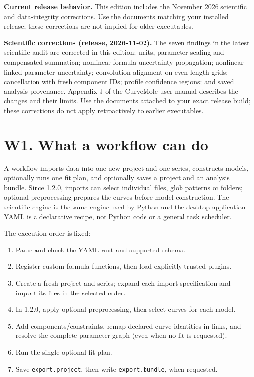 \documentclass[
  10pt,
  a4paper,
  oneside]{scrreprt}
\providecommand{\tightlist}{%
  \setlength{\itemsep}{0pt}\setlength{\parskip}{0pt}}
\begin{document}
\textbf{Current release behavior.} This edition includes the November
2026 scientific and data-integrity corrections. Use the documents
matching your installed release; these corrections are not implied for
older executables.

\textbf{Scientific corrections (release, 2026-11-02).} The seven
findings in the latest scientific audit are corrected in this edition:
units, parameter scaling and compensated summation; nonlinear formula
uncertainty propagation; nonlinear linked-parameter uncertainty;
convolution alignment on even-length grids; cancellation with fresh
component IDs; profile confidence regions; and saved analysis
provenance. Appendix J of the CurveMole user manual describes the
changes and their limits. Use the documents attached to your exact
release build; these corrections do not apply retroactively to earlier
executables.

\hypertarget{w1.-what-a-workflow-can-do}{%
\section{W1. What a workflow can do}\label{w1.-what-a-workflow-can-do}}

A workflow imports data into one new project and one series, constructs
models, optionally runs one fit plan, and optionally saves a project and
an analysis bundle. Since 1.2.0, imports can select individual files,
glob patterns or folders; optional preprocessing prepares the curves
before model construction. The scientific engine is the same engine used
by Python and the desktop application. YAML is a declarative recipe, not
Python code or a general task scheduler.

The execution order is fixed:

\begin{enumerate}
\def\labelenumi{\arabic{enumi}.}
\tightlist
\item
  Parse and check the YAML root and supported schema.
\item
  Register custom formula functions, then load explicitly trusted
  plugins.
\item
  Create a fresh project and series; expand each import specification
  and import its files in the selected order.
\item
  In 1.2.0, apply optional preprocessing, then select curves for each
  model.
\item
  Add components/constraints, remap declared curve identities in links,
  and resolve the complete parameter graph (even when no fit is
  requested).
\item
  Run the single optional fit plan.
\item
  Save \texttt{export.project}, then write \texttt{export.bundle}, when
  requested.
\end{enumerate}
\end{document}
